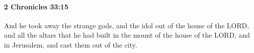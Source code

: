 
		\paragraph{2 Chronicles 33:15} %
			\label{2CHRONICLES-33-15}

			And he took away the strange gods, and the idol out of the house of the LORD, and all the altars that he had built in the mount of the house of the LORD, and in Jerusalem, and cast them out of the city.


